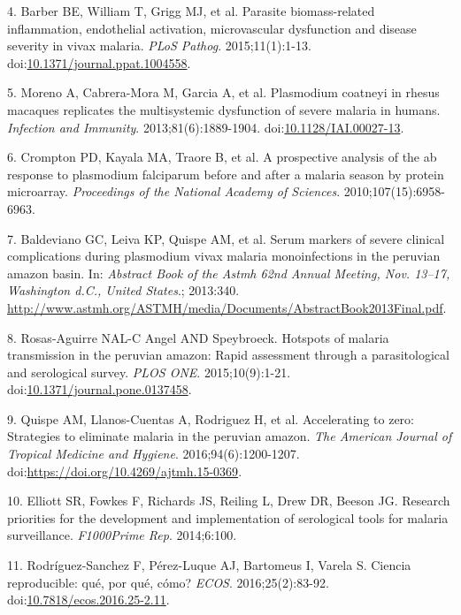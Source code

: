 \documentclass[]{article}
\begin{document}
\hypertarget{ref-barber2015}{}
4. Barber BE, William T, Grigg MJ, et al. Parasite biomass-related
inflammation, endothelial activation, microvascular dysfunction and
disease severity in vivax malaria. \emph{PLoS Pathog}. 2015;11(1):1-13.
doi:\href{https://doi.org/10.1371/journal.ppat.1004558}{10.1371/journal.ppat.1004558}.

\hypertarget{ref-Moreno2013}{}
5. Moreno A, Cabrera-Mora M, Garcia A, et al. Plasmodium coatneyi in
rhesus macaques replicates the multisystemic dysfunction of severe
malaria in humans. \emph{Infection and Immunity}. 2013;81(6):1889-1904.
doi:\href{https://doi.org/10.1128/IAI.00027-13}{10.1128/IAI.00027-13}.

\hypertarget{ref-crompton2010}{}
6. Crompton PD, Kayala MA, Traore B, et al. A prospective analysis of
the ab response to plasmodium falciparum before and after a malaria
season by protein microarray. \emph{Proceedings of the National Academy
of Sciences}. 2010;107(15):6958-6963.

\hypertarget{ref-baldevi2013}{}
7. Baldeviano GC, Leiva KP, Quispe AM, et al. Serum markers of severe
clinical complications during plasmodium vivax malaria monoinfections in
the peruvian amazon basin. In: \emph{Abstract Book of the Astmh 62nd
Annual Meeting, Nov. 13--17, Washington d.C., United States}.; 2013:340.
\url{http://www.astmh.org/ASTMH/media/Documents/AbstractBook2013Final.pdf}.

\hypertarget{ref-hotspots2015}{}
8. Rosas-Aguirre NAL-C Angel AND Speybroeck. Hotspots of malaria
transmission in the peruvian amazon: Rapid assessment through a
parasitological and serological survey. \emph{PLOS ONE}.
2015;10(9):1-21.
doi:\href{https://doi.org/10.1371/journal.pone.0137458}{10.1371/journal.pone.0137458}.

\hypertarget{ref-accelerate2016}{}
9. Quispe AM, Llanos-Cuentas A, Rodriguez H, et al. Accelerating to
zero: Strategies to eliminate malaria in the peruvian amazon. \emph{The
American Journal of Tropical Medicine and Hygiene}.
2016;94(6):1200-1207.
doi:\href{https://doi.org/https://doi.org/10.4269/ajtmh.15-0369}{https://doi.org/10.4269/ajtmh.15-0369}.

\hypertarget{ref-elliott2014}{}
10. Elliott SR, Fowkes F, Richards JS, Reiling L, Drew DR, Beeson JG.
Research priorities for the development and implementation of
serological tools for malaria surveillance. \emph{F1000Prime Rep}.
2014;6:100.

\hypertarget{ref-CienciaReproducible2016}{}
11. Rodríguez-Sanchez F, Pérez-Luque AJ, Bartomeus I, Varela S. Ciencia
reproducible: qué, por qué, cómo? \emph{ECOS}. 2016;25(2):83-92.
doi:\href{https://doi.org/10.7818/ecos.2016.25-2.11}{10.7818/ecos.2016.25-2.11}.
\end{document}
